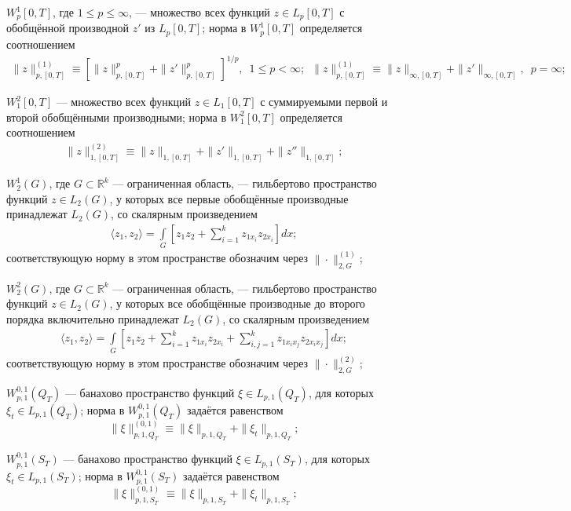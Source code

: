 \documentclass{report}
\begin{document}
$W^1_p[0,T]$, где $1\leqslant p\leqslant\infty$, --- множество всех функций $z\in L_p[0,T]$ с обобщённой производной $z'$ из $L_p[0,T]$; норма в $W^1_p[0,T]$ определяется соотношением
\begin{gather*}
\|z\|^{(1)}_{p,[0,T]}\equiv\left[\|z\|_{p,[0,T]}^p+\|z'\|_{p,[0,T]}^p\right]^{1/p},\,\,\,1\leqslant p<\infty;\,\,\,
\|z\|^{(1)}_{p,[0,T]}\equiv\|z\|_{\infty,[0,T]}+\|z'\|_{\infty,[0,T]},\,\,\,p=\infty;
\end{gather*}

$W^2_1[0,T]$ --- множество всех функций $z\in L_1[0,T]$ с суммируемыми первой и второй обобщёнными производными; норма в $W^2_1[0,T]$ определяется соотношением
\begin{gather*}
\|z\|^{(2)}_{1,[0,T]}\equiv\|z\|_{1,[0,T]}+\|z'\|_{1,[0,T]}+\|z''\|_{1,[0,T]};
\end{gather*}

$W^1_2(G)$, где $G\subset \mathbb{R}^k$  --- ограниченная область, --- гильбертово пространство функций $z\in L_2(G)$, у которых все первые обобщённые производные принадлежат $L_2(G)$, со
скалярным произведением
\begin{gather*}
\langle z_1,z_2\rangle=\int\limits_G\left[z_1z_2+\sum\limits_{i=1}^kz_{1x_i}z_{2x_i}\right]dx;
\end{gather*}
соответствующую норму в этом пространстве обозначим через $\|\cdot\|^{(1)}_{2,G}$;

$W^2_2(G)$, где $G\subset \mathbb{R}^k$  --- ограниченная область, --- гильбертово пространство функций $z\in L_2(G)$, у которых все обобщённые производные до второго порядка включительно
принадлежат $L_2(G)$, со скалярным произведением
\begin{gather*}
\langle z_1,z_2\rangle=\int\limits_G\left[z_1z_2+\sum\limits_{i=1}^kz_{1x_i}z_{2x_i}+\sum\limits_{i,j=1}^kz_{1x_ix_j}z_{2x_ix_j}\right]dx;
\end{gather*}
соответствующую норму в этом пространстве обозначим через $\|\cdot\|^{(2)}_{2,G}$;

$W^{0,1}_{p,1}(Q_T)$ --- банахово пространство функций $\xi\in L_{p,1}(Q_T)$, для которых $\xi_t\in L_{p,1}(Q_T)$; норма в  $W^{0,1}_{p,1}(Q_T)$ задаётся равенством
$$
\|\xi\|^{(0,1)}_{p,1,Q_T}\equiv\|\xi\|_{p,1,Q_T}+\|\xi_t\|_{p,1,Q_T};
$$

$W^{0,1}_{p,1}(S_T)$ --- банахово пространство функций $\xi\in L_{p,1}(S_T)$, для которых $\xi_t\in L_{p,1}(S_T)$; норма в  $W^{0,1}_{p,1}(S_T)$ задаётся равенством
$$
\|\xi\|^{(0,1)}_{p,1,S_T}\equiv\|\xi\|_{p,1,S_T}+\|\xi_t\|_{p,1,S_T};
$$
\end{document}
